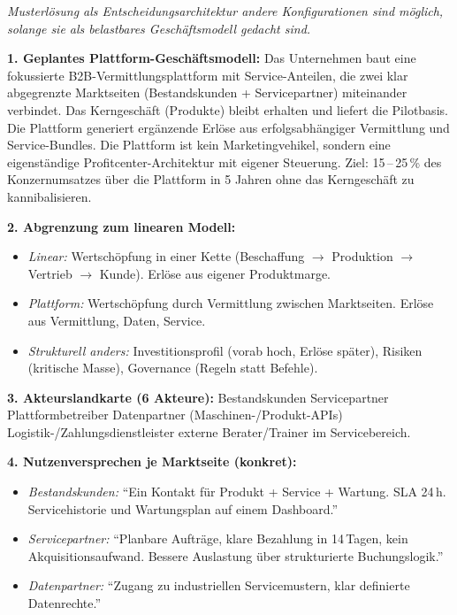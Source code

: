 \documentclass[11pt,a4paper,oneside]{article}
\begin{document}
\begin{loesungbox}
\emph{Musterlösung als Entscheidungsarchitektur \textendash{} andere Konfigurationen sind möglich, solange sie als belastbares Geschäftsmodell gedacht sind.}

\smallskip
\textbf{1. Geplantes Plattform-Geschäftsmodell:}
Das Unternehmen baut eine fokussierte B2B-Vermittlungsplattform mit Service-Anteilen, die zwei klar abgegrenzte Marktseiten (Bestandskunden + Servicepartner) miteinander verbindet. Das Kerngeschäft (Produkte) bleibt erhalten und liefert die Pilotbasis. Die Plattform generiert ergänzende Erlöse aus erfolgsabhängiger Vermittlung und Service-Bundles. Die Plattform ist kein Marketingvehikel, sondern eine eigenständige Profitcenter-Architektur mit eigener Steuerung. Ziel: 15\,--\,25\,\% des Konzernumsatzes über die Plattform in 5 Jahren \textendash{} ohne das Kerngeschäft zu kannibalisieren.

\textbf{2. Abgrenzung zum linearen Modell:}
\begin{itemize}
  \item \emph{Linear:} Wertschöpfung in einer Kette (Beschaffung $\rightarrow$ Produktion $\rightarrow$ Vertrieb $\rightarrow$ Kunde). Erlöse aus eigener Produktmarge.
  \item \emph{Plattform:} Wertschöpfung durch Vermittlung zwischen Marktseiten. Erlöse aus Vermittlung, Daten, Service.
  \item \emph{Strukturell anders:} Investitionsprofil (vorab hoch, Erlöse später), Risiken (kritische Masse), Governance (Regeln statt Befehle).
\end{itemize}

\textbf{3. Akteurslandkarte (6 Akteure):}
Bestandskunden \textperiodcentered{} Servicepartner \textperiodcentered{} Plattformbetreiber \textperiodcentered{} Datenpartner (Maschinen-/Produkt-APIs) \textperiodcentered{} Logistik-/Zahlungsdienstleister \textperiodcentered{} externe Berater/Trainer im Servicebereich.

\textbf{4. Nutzenversprechen je Marktseite (konkret):}
\begin{itemize}
  \item \emph{Bestandskunden:} ``Ein Kontakt für Produkt + Service + Wartung. SLA 24\,h. Servicehistorie und Wartungsplan auf einem Dashboard.''
  \item \emph{Servicepartner:} ``Planbare Aufträge, klare Bezahlung in 14\,Tagen, kein Akquisitionsaufwand. Bessere Auslastung über strukturierte Buchungslogik.''
  \item \emph{Datenpartner:} ``Zugang zu industriellen Servicemustern, klar definierte Datenrechte.''
\end{itemize}


\end{loesungbox}
\end{document}
